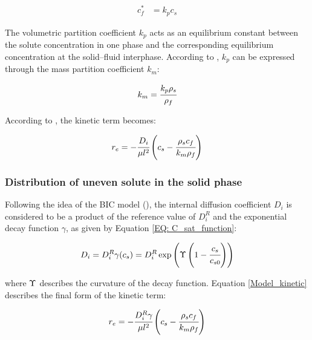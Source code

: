 \documentclass[a4paper,fleqn]{cas-dc}
\begin{document}
			{\footnotesize
				\begin{align} \label{Linear_equilibirum}
					c_f^* &= k_p c_s
			\end{align} }
			
			The volumetric partition coefficient $k_p$ acts as an equilibrium constant between the solute concentration in one phase and the corresponding equilibrium concentration at the solid--fluid interphase. According to \citet{Spiro2007}, $k_p$ can be expressed through the mass partition coefficient $k_m$:
			
			{\footnotesize
				\begin{align}
					k_m = \cfrac{k_p \rho_s}{\rho_f}
			\end{align} }
			
			According to \citet{Reverchon1996}, the kinetic term becomes:
			
			{\footnotesize
				\begin{equation}
					\label{Model_kinetic_no_sat}
					r_e = -\cfrac{D_i}{ \mu l^2 } \left(c_s - \cfrac{\rho_s c_f}{k_m \rho_f} \right)
			\end{equation} }
			
			\subsubsection{Distribution of uneven solute in the solid phase} \label{CH: Gamma_Function}
			
			Following the idea of the BIC model (\citet{Sovova2017}), the internal diffusion coefficient $D_i$ is considered to be a product of the reference value of $D_i^R$ and the exponential decay function $\gamma$, as given by Equation \ref{EQ: C_sat_function}:
			
			{\footnotesize
				\begin{equation}
					D_i = D_i^R \gamma(c_s) = D_i^R \exp \left( \Upsilon \left( 1-\cfrac{ c_s }{c_{s0}} \right) \right) \label{EQ: C_sat_function}
			\end{equation} }
			
			where  ${\color{black}\Upsilon}$ describes the curvature of the decay function. Equation \ref{Model_kinetic} describes the final form of the kinetic term:
			
			{\footnotesize
				\begin{equation}
					\label{Model_kinetic}
					r_e = -\cfrac{D_i^R \gamma }{ \mu l^2 } \left( c_s  - \cfrac{\rho_s c_f }{ k_m \rho_f }  \right)
			\end{equation} }
			
\end{document}
